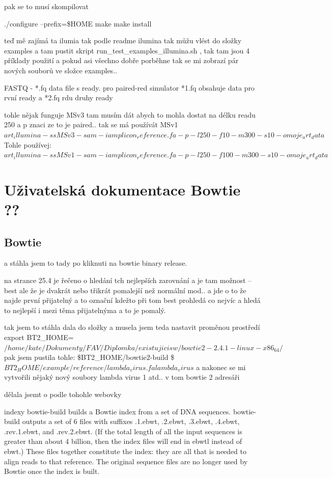 \documentclass[czech,DP]{thesiskiv}
\numberwithin{equation}{section}
\begin{document}
pak se to musí skompilovat 

./configure --prefix=\$HOME
	       	make
	       	make install	 
	 
teď mě zajímá ta ilumia tak podle readme ilumina tak můžu vlést do složky examples a tam pustit skript run\_test\_examples\_illumina.sh , tak tam jsou 4 příklady použití 
a pokud asi všechno dobře porběhne tak se mi zobrazí pár nových souborů ve složce examples.. 

FASTQ - *.fq data file s ready. pro paired-red simulator
*1.fq obsahuje data pro rvní ready a *2.fq rdu druhy ready

tohle nějak funguje
MSv3 tam musím dát abych to mohla dostat na délku readu 250 a p znaci ze to je paired.. 
tak se má používát MSv1
$art_illumina -ss MSv3 -sam -i amplicon_reference.fa -p -l 250 -f 10 -m 300 -s 10 -o moje_art_data$
Tohle používej:
$art_illumina -ss MSv1 -sam -i amplicon_reference.fa -p -l 250 -f 100 -m 300 -s 10 -o moje_art_data$

\chapter{Uživatelská dokumentace Bowtie ??}
\section{Bowtie}
 a stáhla jsem to tady %
 po kliknuti na bowtie binary release.

na strance 25.4 je řečeno o hledání tch nejlepších zarovnání a je tam možnost --best ale že je dvakrát nebo třikrát pomalejší než normální mod.. a jde o to že najde první přijatelný a to označní kdežto při tom best prohledá co nejvíc a hledá to nejlepší i mezi těma přijatelnýma a to je pomalý.


tak jsem  to stáhla dala do složky a musela jsem teda nastavit proměnou prostředí 
export BT2\_HOME=$/home/kate/Dokumenty/FAV/Diplomka/existujicisw/bowtie2-2.4.1-linux-x86_64/$
pak jsem pustila tohle: 
\$BT2\_HOME/bowtie2-build \$ $BT2_HOME/example/reference/lambda_virus.fa lambda_virus$
a nakonec se mi vytvořili nějaký nový soubory lambda virus 1 atd.. v tom bowtie 2 adresáři

dělala jsemt o podle tohohle webovky %



indexy
bowtie-build builds a Bowtie index from a set of DNA sequences. bowtie-build outputs a set of 6 files with suffixes .1.ebwt, .2.ebwt, .3.ebwt, .4.ebwt, .rev.1.ebwt, and .rev.2.ebwt. (If the total length of all the input sequences is greater than about 4 billion, then the index files will end in ebwtl instead of ebwt.)
 These files together constitute the index: they are all that is needed to align reads to that reference. The original sequence files are no longer used by Bowtie once the index is built.
\end{document}
